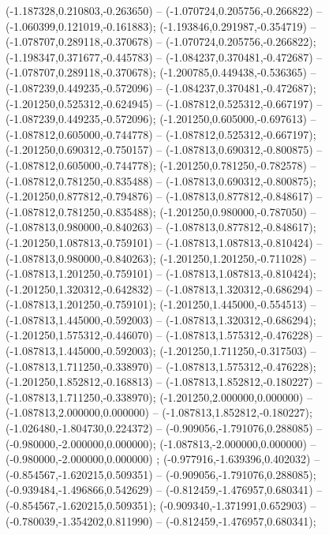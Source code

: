  (-1.187328,0.210803,-0.263650) -- (-1.070724,0.205756,-0.266822) -- (-1.060399,0.121019,-0.161883);
 (-1.193846,0.291987,-0.354719) -- (-1.078707,0.289118,-0.370678) -- (-1.070724,0.205756,-0.266822);
 (-1.198347,0.371677,-0.445783) -- (-1.084237,0.370481,-0.472687) -- (-1.078707,0.289118,-0.370678);
 (-1.200785,0.449438,-0.536365) -- (-1.087239,0.449235,-0.572096) -- (-1.084237,0.370481,-0.472687);
 (-1.201250,0.525312,-0.624945) -- (-1.087812,0.525312,-0.667197) -- (-1.087239,0.449235,-0.572096);
 (-1.201250,0.605000,-0.697613) -- (-1.087812,0.605000,-0.744778) -- (-1.087812,0.525312,-0.667197);
 (-1.201250,0.690312,-0.750157) -- (-1.087813,0.690312,-0.800875) -- (-1.087812,0.605000,-0.744778);
 (-1.201250,0.781250,-0.782578) -- (-1.087812,0.781250,-0.835488) -- (-1.087813,0.690312,-0.800875);
 (-1.201250,0.877812,-0.794876) -- (-1.087813,0.877812,-0.848617) -- (-1.087812,0.781250,-0.835488);
 (-1.201250,0.980000,-0.787050) -- (-1.087813,0.980000,-0.840263) -- (-1.087813,0.877812,-0.848617);
 (-1.201250,1.087813,-0.759101) -- (-1.087813,1.087813,-0.810424) -- (-1.087813,0.980000,-0.840263);
 (-1.201250,1.201250,-0.711028) -- (-1.087813,1.201250,-0.759101) -- (-1.087813,1.087813,-0.810424);
 (-1.201250,1.320312,-0.642832) -- (-1.087813,1.320312,-0.686294) -- (-1.087813,1.201250,-0.759101);
 (-1.201250,1.445000,-0.554513) -- (-1.087813,1.445000,-0.592003) -- (-1.087813,1.320312,-0.686294);
 (-1.201250,1.575312,-0.446070) -- (-1.087813,1.575312,-0.476228) -- (-1.087813,1.445000,-0.592003);
 (-1.201250,1.711250,-0.317503) -- (-1.087813,1.711250,-0.338970) -- (-1.087813,1.575312,-0.476228);
 (-1.201250,1.852812,-0.168813) -- (-1.087813,1.852812,-0.180227) -- (-1.087813,1.711250,-0.338970);
 (-1.201250,2.000000,0.000000) -- (-1.087813,2.000000,0.000000) -- (-1.087813,1.852812,-0.180227);
 (-1.026480,-1.804730,0.224372) -- (-0.909056,-1.791076,0.288085) -- (-0.980000,-2.000000,0.000000);
 (-1.087813,-2.000000,0.000000) -- (-0.980000,-2.000000,0.000000) ;
 (-0.977916,-1.639396,0.402032) -- (-0.854567,-1.620215,0.509351) -- (-0.909056,-1.791076,0.288085);
 (-0.939484,-1.496866,0.542629) -- (-0.812459,-1.476957,0.680341) -- (-0.854567,-1.620215,0.509351);
 (-0.909340,-1.371991,0.652903) -- (-0.780039,-1.354202,0.811990) -- (-0.812459,-1.476957,0.680341);
